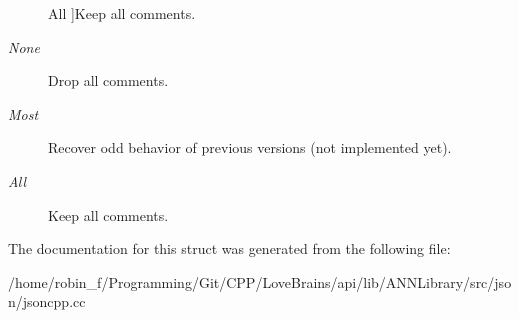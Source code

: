 \begin{Desc}
\begin{description}
{All\label{struct_json_1_1_comment_style_a51fc08f3518fd81eba12f340d19a3d0ca23cbf2619e7ca2201259b71212089d6b}
}]Keep all comments. \item[{\em 
None\label{struct_json_1_1_comment_style_a51fc08f3518fd81eba12f340d19a3d0ca36399eca8a3b9d995dd8ab0ecb6b5398}
}]Drop all comments. \item[{\em 
Most\label{struct_json_1_1_comment_style_a51fc08f3518fd81eba12f340d19a3d0ca0a9010dbb245e235801402fcc930e3ae}
}]Recover odd behavior of previous versions (not implemented yet). \item[{\em 
All\label{struct_json_1_1_comment_style_a51fc08f3518fd81eba12f340d19a3d0ca23cbf2619e7ca2201259b71212089d6b}
}]Keep all comments. \end{description}
\end{Desc}


The documentation for this struct was generated from the following file\+:\begin{DoxyCompactItemize}
\item 
/home/robin\+\_\+f/\+Programming/\+Git/\+C\+P\+P/\+Love\+Brains/api/lib/\+A\+N\+N\+Library/src/json/jsoncpp.\+cc\end{DoxyCompactItemize}
